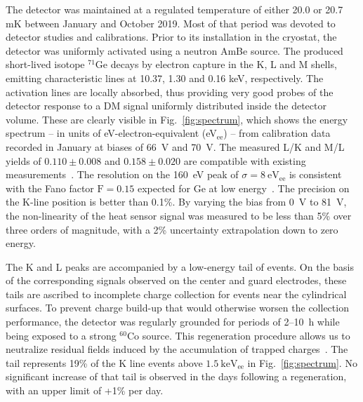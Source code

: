 \documentclass[aps,nofootinbib,floatfix,showpacs,preprintnumbers,twocolumn,superscriptaddress]{revtex4}
\begin{document}
The detector was maintained at a regulated temperature of either 20.0 or 20.7 mK between January and October 2019. 
Most of that period was devoted to detector studies and calibrations. Prior to its installation in the cryostat, the detector was uniformly activated using a neutron AmBe source. The produced short-lived isotope $^{71}$Ge decays by electron capture in the K, L and M shells, emitting characteristic lines at 10.37, 1.30 and 0.16 keV, respectively. The activation lines are locally absorbed, thus providing very good probes of the detector response to a DM signal uniformly distributed inside the detector volume. These are clearly visible in Fig.~\ref{fig:spectrum}, which shows the energy spectrum -- in units of eV-electron-equivalent (eV$_{\mathrm{ee}}$) -- from calibration data recorded in January at biases of 66~V and 70~V. The measured L/K and M/L yields of $0.110\pm0.008$ and $0.158\pm0.020$ are compatible with existing measurements~\cite{KLMratios1,KLMratios2}.
The resolution on the 160~eV peak of $\sigma=8~\mathrm{eV_{ee}}$ is consistent with the Fano factor $\mathrm{F}=0.15$ expected for Ge at low energy~\cite{FanoGe}. The precision on the K-line position is better than 0.1\%. By varying the bias from 0~V to 81~V, the non-linearity of the heat sensor signal was measured to be less than 5\% over three orders of magnitude, with a 2\% uncertainty extrapolation down to zero energy.

The K and L peaks are accompanied by a low-energy tail of events. On the basis of the corresponding signals observed on the center and guard electrodes, these tails are ascribed to incomplete charge collection for events near the cylindrical surfaces. To prevent charge build-up that would otherwise worsen the collection performance, the detector was regularly grounded for periods of 2--10~h while being exposed to a strong $^{60}$Co source. This regeneration procedure allows us to neutralize residual fields induced by the accumulation of trapped charges~\cite{edwtech}. The tail represents 19\% of the K line events above $1.5~\mathrm{ keV_{ee}}$ in Fig.~\ref{fig:spectrum}. No significant increase of that tail is observed in the days following a regeneration, with an upper limit of +1\% per day.  
\end{document}
